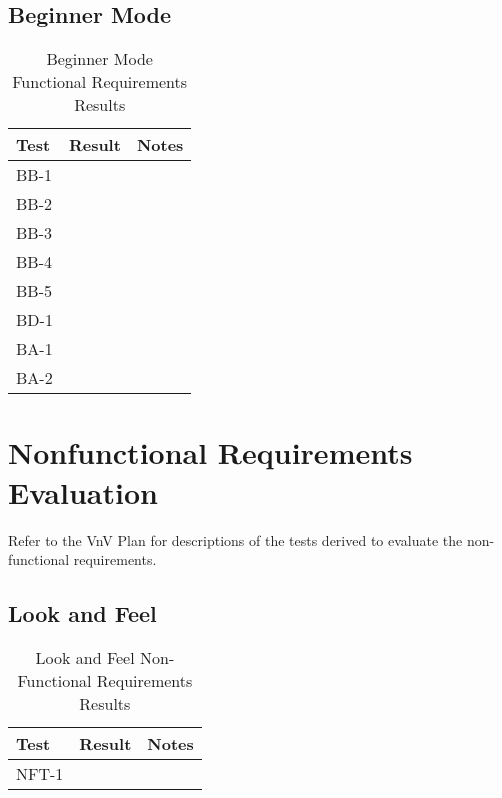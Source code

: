 \documentclass[12pt, titlepage]{article}
\begin{document}
\subsection{Beginner Mode}

\begin{table}[H]
  \centering
      \setlength{\leftmargini}{0.4cm}
      \begin{tabular}{| >{\centering\arraybackslash}m{3cm} | 
        >{\centering\arraybackslash}m{4cm} | 
        >{\centering\arraybackslash}m{6cm} |}
      \hline
      \rowcolor[gray]{0.9}
      Test & Result & Notes\\
      \hline
      BB-1 &  & \\
      \hline
      BB-2 &  & \\
      \hline
      BB-3 &  & \\
      \hline
      BB-4 &  & \\
      \hline
      BB-5 &  & \\
      \hline
      BD-1 &  & \\
      \hline
      BA-1 &  & \\
      \hline
      BA-2 &  & \\
      \hline
      \end{tabular}
  \caption{Beginner Mode Functional Requirements Results}
  \end{table}

\section{Nonfunctional Requirements Evaluation}
Refer to the VnV Plan for descriptions of the tests derived to evaluate the non-functional requirements.

\subsection{Look and Feel}

\begin{table}[H]
\centering
    \setlength{\leftmargini}{0.4cm}
    \begin{tabular}{| >{\centering\arraybackslash}m{3cm} | 
      >{\centering\arraybackslash}m{4cm} | 
      >{\centering\arraybackslash}m{6cm} |}
    \hline
    \rowcolor[gray]{0.9}
    Test & Result & Notes\\
    \hline
    NFT-1 &  & \\
    \hline
    \end{tabular}
\caption{Look and Feel Non-Functional Requirements Results}
\end{table}
		
\end{document}
